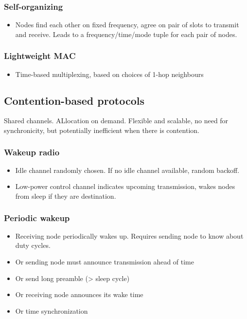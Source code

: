 \subsubsection{Self-organizing}

\begin{itemize}
		\item Nodes find each other on fixed frequency, agree on pair of slots
				to transmit and receive. Leads to a frequency/time/mode tuple
				for each pair of nodes.
\end{itemize}

\subsubsection{Lightweight MAC}

\begin{itemize}
		\item Time-based multiplexing, based on choices of 1-hop neighbours
\end{itemize}

\subsection{Contention-based protocols}

Shared channels. ALlocation on demand. Flexible and scalable, no need for
synchronicity, but potentially inefficient when there is contention.

\subsubsection{Wakeup radio}

\begin{itemize}
		\item Idle channel randomly chosen. If no idle channel available, random backoff.
		\item Low-power control channel indicates upcoming transmission, wakes
				nodes from sleep if they are destination.
\end{itemize}

\subsubsection{Periodic wakeup}

\begin{itemize}
		\item Receiving node periodically wakes up. Requires sending node to know about duty cycles.
		\item Or sending node must announce transmission ahead of time
		\item Or send long preamble (> sleep cycle)
		\item Or receiving node announces its wake time
		\item Or time synchronization
\end{itemize}

